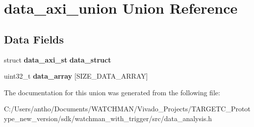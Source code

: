\section{data\+\_\+axi\+\_\+union Union Reference}
\label{uniondata__axi__union}
\subsection*{Data Fields}
\begin{DoxyCompactItemize}
\item 
\mbox{\label{uniondata__axi__union_a36277ea8982d2b019ca86fef2b800a7b}} 
struct \textbf{ data\+\_\+axi\+\_\+st} {\bfseries data\+\_\+struct}
\item 
\mbox{\label{uniondata__axi__union_a3d25c878d42be1e014f8ee5e7691f154}} 
uint32\+\_\+t {\bfseries data\+\_\+array} [S\+I\+Z\+E\+\_\+\+D\+A\+T\+A\+\_\+\+A\+R\+R\+AY]
\end{DoxyCompactItemize}


The documentation for this union was generated from the following file\+:\begin{DoxyCompactItemize}
\item 
C\+:/\+Users/antho/\+Documents/\+W\+A\+T\+C\+H\+M\+A\+N/\+Vivado\+\_\+\+Projects/\+T\+A\+R\+G\+E\+T\+C\+\_\+\+Prototype\+\_\+new\+\_\+version/sdk/watchman\+\_\+with\+\_\+trigger/src/data\+\_\+analysis.\+h\end{DoxyCompactItemize}
